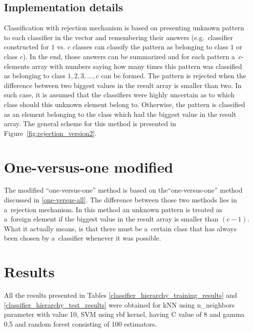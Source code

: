 \subsection{Implementation details}

Classification with rejection mechanism is based on presenting unknown pattern to each classifier in the vector and remembering their answers (e.g.~classifier constructed for $1$ vs. $c$ classes can classify the pattern as belonging to class $1$ or class $c$). In the end, those answers can be summarized and for each pattern a~$c$-elements array with numbers saying how many times this pattern was classified as belonging to class $1, 2, 3, \ldots, c$ can be formed. The pattern is rejected when the difference between two biggest values in the result array is smaller than two. In such case, it is assumed that the classifiers were highly uncertain as to which class should this unknown element belong to. Otherwise, the pattern is classified as an element belonging to the class which had the biggest value in the result array. The general scheme for this method is presented in Figure~\ref{fig:rejection_version2}. 

\section{One-versus-one modified}

The modified ``one-versus-one'' method is based on the``one-versus-one'' method discussed in \ref{one-versus-all}. The difference between those two methods lies in a~rejection mechanism. In this method an unknown pattern is treated as a~foreign element if the biggest value in the result array is smaller than $(c-1)$. What it actually means, is that there must be a~certain class that has always been chosen by a~classifier whenever it was possible.

\section{Results}

All the results presented in Tables \ref{classifier_hierarchy_training_results} and \ref{classifier_hierarchy_test_results} were obtained for kNN using n\_neighbors parameter with value 10, SVM using rbf kernel, having C value of 8 and gamma 0.5 and random forest consisting of 100 estimators.

